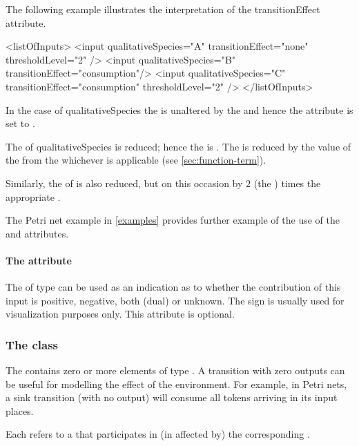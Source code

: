The following example illustrates the interpretation of the transitionEffect attribute. 

\begin{example}
<listOfInputs>
    <input qualitativeSpecies="A"   transitionEffect="none"        thresholdLevel="2" />
    <input qualitativeSpecies="B"   transitionEffect="consumption"/>
    <input qualitativeSpecies="C"   transitionEffect="consumption" thresholdLevel="2" />
</listOfInputs>
\end{example}

In the case of qualitativeSpecies  the  is unaltered by the \Transition and hence the  attribute is set to . 

The  of qualitativeSpecies  is reduced; hence the  is . The  is reduced by the value of the  from the whichever \FunctionTerm is applicable  (see \ref{sec:function-term}). 

Similarly, the  of  is also reduced, but on this occasion by $2$ (the ) times the appropriate  . 

The Petri net example in \ref{examples} provides further example of the use of the  and  attributes. 


 
\paragraph{The  attribute}
The  of type  can be used as an indication as to whether the contribution of this input is positive, negative, both (dual) or unknown. The sign is usually used for visualization purposes only. This attribute is optional.


\subsubsection{The  class}
\label{output-class}
The \ListOfOutputs contains zero or more elements of type \Output. A transition with zero outputs can be useful for modelling the effect of the environment. For example, in Petri nets, a sink transition (with no output) will consume all tokens arriving in its input places. 

Each \Output refers to a \QualitativeSpecies that participates in (in affected by) the corresponding \Transition.

